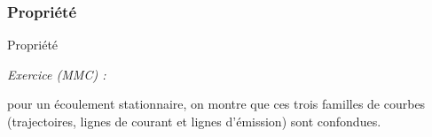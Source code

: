 \subsubsection{Propriété}
\begin{frame}{Propriété}

\small
\textcolor{vert}{\sl Exercice (MMC) :}

\medskip

\hspace*{10mm}
\begin{minipage}{100mm}
pour un écoulement stationnaire, on montre que ces trois familles de courbes \\
(trajectoires, lignes de courant et lignes d'émission) sont confondues.
\end{minipage}

\vspace{50mm}

\end{frame}


